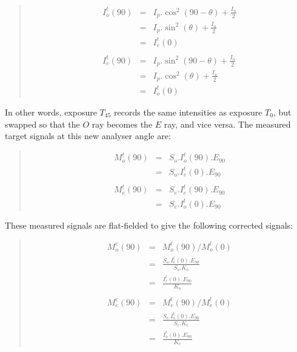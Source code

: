 \documentclass[twoside,11pt]{article}
\renewcommand{\_}{\texttt{\symbol{95}}}
\newenvironment{myquote}{\begin{quote}\begin{small}}{\end{small}\end{quote}}
\begin{document}
\begin{myquote}
\begin{eqnarray*}
  I^{t}_{o}(90) & = & I_{p}.\cos^{2}( 90 - \theta ) + \frac{I_{u}}{2} \\
                 & = & I_{p}.\sin^{2}( \theta ) + \frac{I_{u}}{2} \\
                 & = & I^{t}_{e}(0) \\ \\
  I^{t}_{e}(90) & = & I_{p}.\sin^{2}( 90 - \theta ) + \frac{I_{u}}{2} \\
                 & = & I_{p}.\cos^{2}( \theta ) + \frac{I_{u}}{2} \\
                 & = & I^{t}_{o}(0) 
\end{eqnarray*}
\end{myquote}

In other words, exposure $T_{45}$ records the same intensities as
exposure $T_{0}$, but swapped so that the $O$ ray becomes the
$E$ ray, and vice versa. The measured target signals at this new
analyser angle are:

\begin{myquote}
\begin{eqnarray*}
  M^{t}_{o}(90) & = & S_{o}.I^{t}_{o}(90).E_{90} \\
                & = & S_{o}.I^{t}_{e}(0).E_{90} \\ \\
  M^{t}_{e}(90) & = & S_{e}.I^{t}_{e}(90).E_{90} \\
                & = & S_{e}.I^{t}_{o}(0).E_{90} 
\end{eqnarray*}
\end{myquote}

These measured signals are flat-fielded to give the following corrected
signals:

\begin{myquote}
\begin{eqnarray*}
  M^{c}_{o}(90) & = & M^{t}_{o}(90) / M^{l}_{o}(0) \\
                & = & \frac{ S_{o}.I^{t}_{e}(0).E_{90} }{ S_{o}.K_{o} } \\
                & = & \frac{ I^{t}_{e}(0).E_{90} }{ K_{o} } \\ \\
  M^{c}_{e}(90) & = & M^{t}_{e}(90) / M^{l}_{e}(0) \\
                & = & \frac{ S_{e}.I^{t}_{o}(0).E_{90} }{ S_{e}.K_{e} } \\
                & = & \frac{ I^{t}_{o}(0).E_{90} }{ K_{e} } 
\end{eqnarray*}
\end{myquote}
\end{document}
